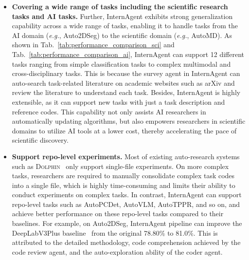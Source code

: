 \begin{itemize}
    \item \textbf{Covering a wide range of tasks including the scientific research tasks and AI tasks.} Further, InternAgent exhibits strong generalization capability across a wide range of tasks, enabling it to handle tasks from the AI domain (\textit{e.g.}, Auto2DSeg) to the scientific domain (\textit{e.g.}, AutoMD). As shown in Tab.~\ref{tab:performance_comparison_sci} and Tab.~\ref{tab:performance_comparison_ai}, InternAgent can support 12 different tasks ranging from simple classification tasks to complex multimodal and cross-disciplinary tasks. This is because the survey agent in InternAgent can auto-search task-related literature on academic websites such as arXiv and review the literature to understand each task. Besides, InternAgent is highly extensible, as it can support new tasks with just a task description and reference codes. This capability not only assists AI researchers in automatically updating algorithms, but also empowers researchers in scientific domains to utilize AI tools at a lower cost, thereby accelerating the pace of scientific discovery.
    
    \item \textbf{Support repo-level experiments.} Most of existing auto-research systems such as \textsc{Dolphin}~\citep{yuan2025dolphin} only support single-file experiments. On more complex tasks, researchers are required to manually consolidate complex task codes into a single file, which is highly time-consuming and limits their ability to conduct experiments on complex tasks. In contrast, InternAgent can support repo-level tasks such as AutoPCDet, AutoVLM, AutoTPPR, and so on, and achieve better performance on these repo-level tasks compared to their baselines. For example, on Auto2DSeg, InternAgent pipeline can improve the DeepLabV3Plus baseline~\citep{chen2018encoder}  from the original 78.80\% to 81.0\%. This is attributed to the detailed methodology, code comprehension achieved by the code review agent, and the auto-exploration ability of the coder agent.

\end{itemize}


